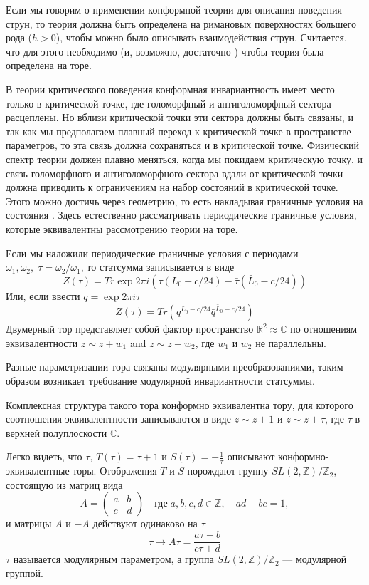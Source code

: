 \documentclass[a4paper,12pt]{article}
\theoremstyle{definition} \newtheorem{Def}{Definition}
\begin{document}
Если мы говорим о применении конформной теории для описания поведения струн, то теория должна быть
определена на римановых поверхностях большего рода ($h>0$), чтобы можно было описывать
взаимодействия струн. Считается, что для этого необходимо (и, возможно, достаточно
\cite{gaberdiel2000icf}) чтобы теория была определена на торе.

В теории критического поведения конформная инвариантность имеет место только в критической точке,
где голоморфный и антиголоморфный сектора расцеплены. Но вблизи критической точки эти сектора должны
быть связаны, и так как мы предполагаем плавный переход к критической точке в пространстве
параметров, то эта связь должна сохраняться и в критической точке. Физический спектр теории должен
плавно меняться, когда мы покидаем критическую точку, и связь голоморфного и антиголоморфного
сектора вдали от критической точки должна приводить к ограничениям на набор состояний в критической
точке. Этого можно достичь через геометрию, то есть накладывая граничные условия на состояния
\cite{difrancesco1997cft}. Здесь естественно рассматривать периодические граничные условия, которые
эквивалентны рассмотрению теории на торе.

Если мы наложили периодические граничные условия с периодами $\omega_1, \omega_2,\; \tau=\omega_2/\omega_1$, то статсумма записывается в виде
\begin{equation}
  \label{eq:1}
  Z(\tau)=Tr \exp 2\pi i (\tau (L_0-c/24)-\bar{\tau} (\bar{L}_0-c/24))
\end{equation}
Или, если ввести $q=\exp 2\pi i \tau$
\begin{equation}
  \label{eq:2}
  Z(\tau)=Tr \left (q^{L_0-c/24}\bar{q}^{\bar{L}_0-c/24}\right)
\end{equation}
Двумерный тор представляет собой фактор пространство $\mathbb{R}^2\approx \mathbb{C}$ по отношениям эквивалентности $z\sim z+w_1$ and $z\sim z+w_2$, где $w_1$ и $w_2$ не параллельны. 

Разные параметризации тора связаны модулярными преобразованиями, таким образом возникает требование модулярной инвариантности статсуммы.

Комплексная структура такого тора конформно эквивалентна тору, для которого соотношения эквивалентности записываются в виде $z\sim z+1$ и $z\sim z+\tau$, где $\tau$ в верхней полуплоскости $\mathbb{C}$.

Легко видеть, что $\tau$, $T(\tau)=\tau+1$ и $S(\tau)=-\frac{1}{\tau}$ описывают конформно-эквивалентные торы. Отображения $T$ и $S$ порождают группу  $SL(2,\mathbb{Z})/\mathbb{Z}_2$, состоящую из матриц вида
\begin{equation}
  \label{eq:99}
  A=
  \begin{pmatrix}
    a & b\\
    c & d 
  \end{pmatrix}
  \quad\mbox{где}\; a,b,c,d\in\mathbb{Z},\quad ad-bc=1,
\end{equation}
и матрицы $A$ и $-A$ действуют одинаково на $\tau$
\begin{equation}
  \label{eq:100}
  \tau\to A\tau=\frac{a\tau+b}{c\tau+d}
\end{equation}
 $\tau$ называется модулярным параметром, а группа $SL(2,\mathbb{Z})/\mathbb{Z}_2$ --- модулярной группой.
\end{document}
